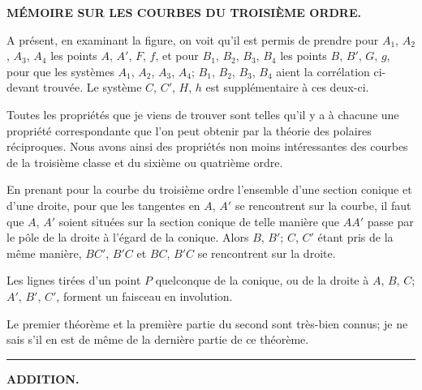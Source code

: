 \documentclass[11pt,a4paper]{article}
\begin{document}

\begin{center}
{\large\bfseries M\'{E}MOIRE SUR LES COURBES DU TROISI\`{E}ME ORDRE.}
\end{center}

\fancyfoot[C]{\thepage}

A pr\'{e}sent, en examinant la figure, on voit qu'il est permis de prendre pour $A_1$, $A_2$,
$A_3$, $A_4$ les points $A$, $A'$, $F$, $f$, et pour $B_1$, $B_2$, $B_3$, $B_4$ les points $B$, $B'$, $G$, $g$, pour que
les syst\`{e}mes $A_1$, $A_2$, $A_3$, $A_4$; $B_1$, $B_2$, $B_3$, $B_4$ aient la corr\'{e}lation ci-devant trouv\'{e}e. Le
syst\`{e}me $C$, $C'$, $H$, $h$ est suppl\'{e}mentaire \`{a} ces deux-ci.

Toutes les propri\'{e}t\'{e}s que je viens de trouver sont telles qu'il y a \`{a} chacune une
propri\'{e}t\'{e} correspondante que l'on peut obtenir par la th\'{e}orie des polaires r\'{e}ciproques.
Nous avons ainsi des propri\'{e}t\'{e}s non moins int\'{e}ressantes des courbes de la troisi\`{e}me
classe et du sixi\`{e}me ou quatri\`{e}me ordre.

En prenant pour la courbe du troisi\`{e}me ordre l'ensemble d'une section conique et
d'une droite, pour que les tangentes en $A$, $A'$ se rencontrent sur la courbe, il faut que
$A$, $A'$ soient situ\'{e}es sur la section conique de telle mani\`{e}re que $AA'$ passe par le p\^{o}le
de la droite \`{a} l'\'{e}gard de la conique. Alors $B$, $B'$; $C$, $C'$ \'{e}tant pris de la m\^{e}me mani\`{e}re,
$BC'$, $B'C$ et $BC$, $B'C$ se rencontrent sur la droite.

Les lignes tir\'{e}es d'un point $P$ quelconque de la conique, ou de la droite \`{a} $A$, $B$, $C$;
$A'$, $B'$, $C'$, forment un faisceau en involution.

Le premier th\'{e}or\`{e}me et la premi\`{e}re partie du second sont tr\`{e}s-bien connus; je ne
sais s'il en est de m\^{e}me de la derni\`{e}re partie de ce th\'{e}or\`{e}me.

\begin{center}
\rule{0.5\textwidth}{0.4pt}
\end{center}

\begin{center}
\textbf{ADDITION.}
\end{center}
\end{document}
